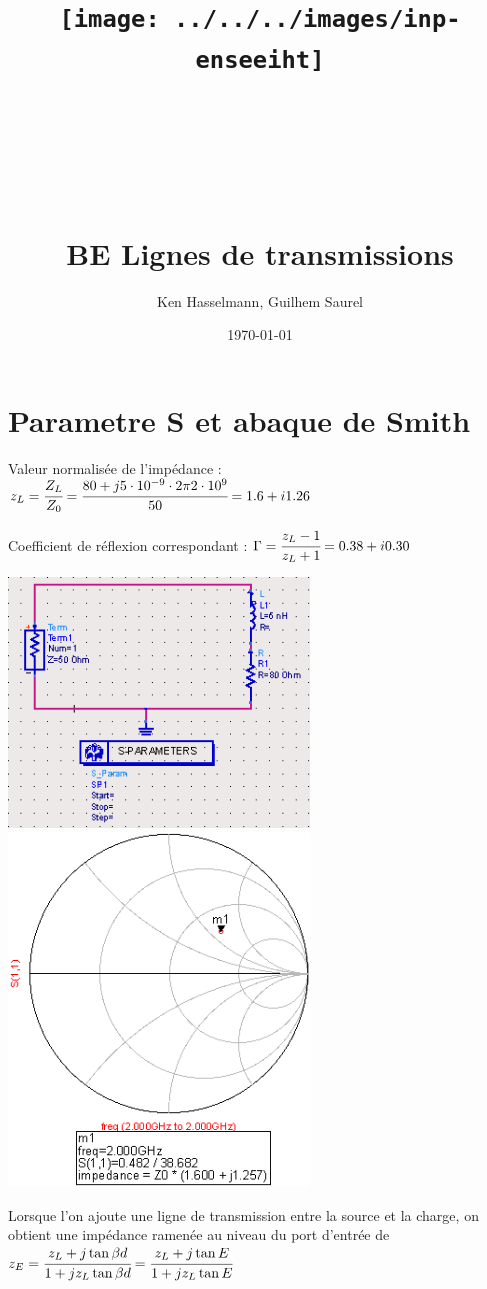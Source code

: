 \documentclass[10pt]{article}
\title{\texttt{[image: ../../../images/inp-enseeiht]} \\ ~ \\ ~ \\ ~ \\ ~ \\BE Lignes de transmissions}
\author{Ken Hasselmann, Guilhem Saurel}
\date{\today}
\begin{document}
 \begin{titlepage}
  \maketitle
  \tableofcontents
 \end{titlepage}

  \section{Parametre S et abaque de Smith}
   Valeur normalisée de l’impédance : $z_L=\cfrac{Z_L}{Z_0}=\cfrac{80 + j 5 \cdot 10^{-9} \cdot 2 \pi 2 \cdot 10^9}{50} = 1.6+i1.26$

   Coefficient de réflexion correspondant : $\Gamma = \cfrac{z_L-1}{z_L+1}=0.38+i0.30$

   \includegraphics[width=8cm]{I2_a_circuit.PNG}
   \includegraphics[width=8cm]{I2_a_smith.PNG}

   \newpage

   Lorsque l’on ajoute une ligne de transmission entre la source et la charge, on obtient une impédance ramenée au niveau du port d’entrée de $z_E = \cfrac{z_L +j \tan{\beta d}}{1 + j z_L \tan{\beta d}}=\cfrac{z_L +j \tan{E}}{1 + j z_L \tan{E}}$
\end{document}

